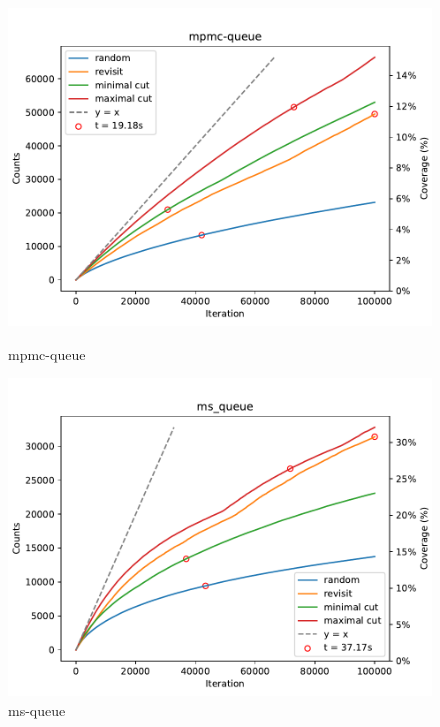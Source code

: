 \begin{figure}[h!]
	\begin{minipage}{0.45\textwidth}
		\centering
		\includegraphics[width=\textwidth]{figure/genmc/mpmc-queue.pdf}
		\caption{mpmc-queue}
		\label{genmc:mpmc-queue}
	\end{minipage}
	\hfill
	\begin{minipage}{0.45\textwidth}
		\centering
		\includegraphics[width=\textwidth]{figure/genmc/ms_queue.pdf}
		\caption{ms-queue}
		\label{genmc:ms-queue}
	\end{minipage}

	\vspace{0.5cm}


\end{figure}

